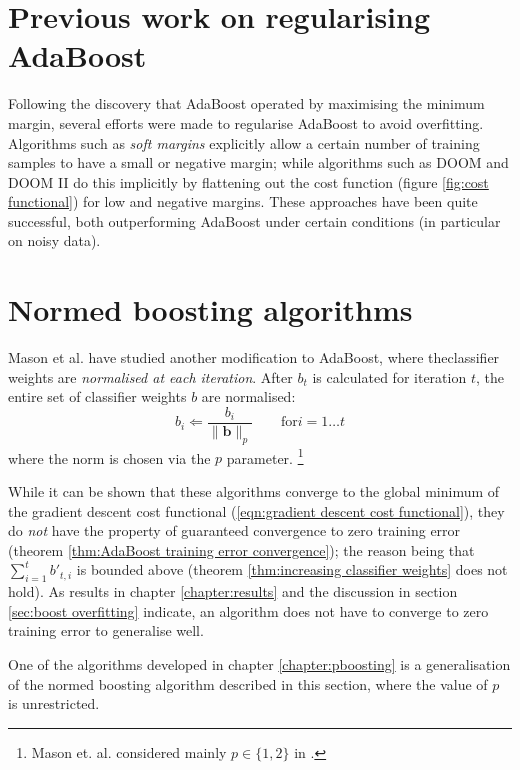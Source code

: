\section{Previous work on regularising AdaBoost}

Following the discovery that AdaBoost operated by maximising the
minimum margin, several efforts were made to regularise AdaBoost to
avoid overfitting.  Algorithms such as \emph{soft margins}
\cite{Ratsch98} explicitly allow a certain number of training samples
to have a small or negative margin; while algorithms such as DOOM and
DOOM II \cite{Mason99a, Mason99b} do this implicitly by flattening out
the cost function (figure \ref{fig:cost functional}) for low and
negative margins.  These approaches have been quite successful, both
outperforming AdaBoost under certain conditions (in particular on
noisy data).


\section{Normed boosting algorithms}

Mason et al. \cite{Mason99a} have studied another modification to
AdaBoost, where theclassifier weights are \emph{normalised at each
iteration}.  After $b_t$ is calculated for iteration $t$, the entire
set of classifier weights $b$ are normalised:
%
\begin{equation}
b_{i} \Leftarrow \frac{b_i}{\| \mathbf{b} \|_p} \qquad \mbox{for} i=1
\ldots t
\end{equation}
%
where the norm is chosen via the $p$ parameter.%
\footnote{Mason et. al. considered mainly $p \in \{ 1,2 \}$ in
\cite{Mason99a}.}

While it can be shown that these algorithms converge to the global
minimum of the gradient descent cost functional (\ref{eqn:gradient
descent cost functional}), they do \emph{not} have the property of
guaranteed convergence to zero training error (theorem
\ref{thm:AdaBoost training error convergence}); the reason being that 
$\sum_{i=1}^t b'_{t,i}$ is bounded above (theorem \ref{thm:increasing
classifier weights} does not hold).  As results in chapter
\ref{chapter:results} and the discussion in section \ref{sec:boost
overfitting} indicate, an algorithm does not have to converge to zero
training error to generalise well.

One of the algorithms developed in chapter \ref{chapter:pboosting} is
a generalisation of the normed boosting algorithm described in this
section, where the value of $p$ is unrestricted.





